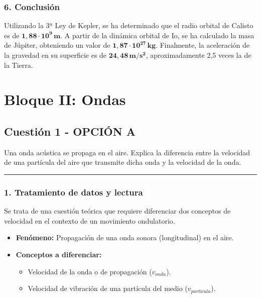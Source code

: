\subsubsection*{6. Conclusión}
\begin{cajaconclusion}
    Utilizando la 3ª Ley de Kepler, se ha determinado que el radio orbital de Calisto es de $\mathbf{1,88 \cdot 10^9 \, m}$. A partir de la dinámica orbital de Io, se ha calculado la masa de Júpiter, obteniendo un valor de $\mathbf{1,87 \cdot 10^{27} \, kg}$. Finalmente, la aceleración de la gravedad en su superficie es de $\mathbf{24,48 \, m/s^2}$, aproximadamente 2,5 veces la de la Tierra.
\end{cajaconclusion}

\newpage

\section{Bloque II: Ondas}
\label{sec:ondas_2004_sep_cv}

\subsection{Cuestión 1 - OPCIÓN A}
\label{subsec:2A_2004_sep_cv}

\begin{cajaenunciado}
Una onda acústica se propaga en el aire. Explica la diferencia entre la velocidad de una partícula del aire que transmite dicha onda y la velocidad de la onda.
\end{cajaenunciado}
\hrule

\subsubsection*{1. Tratamiento de datos y lectura}
Se trata de una cuestión teórica que requiere diferenciar dos conceptos de velocidad en el contexto de un movimiento ondulatorio.
\begin{itemize}
    \item \textbf{Fenómeno:} Propagación de una onda sonora (longitudinal) en el aire.
    \item \textbf{Conceptos a diferenciar:}
    \begin{itemize}
        \item Velocidad de la onda o de propagación ($v_{onda}$).
        \item Velocidad de vibración de una partícula del medio ($v_{partícula}$).
    \end{itemize}
\end{itemize}

